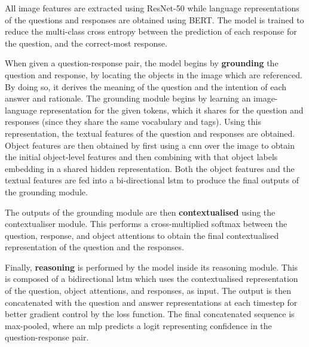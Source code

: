 All image features are extracted using ResNet-50\cite{he_deep_2015} while language representations of the questions and responses are obtained using BERT\cite{devlin_bert_2019}.
The model is trained to reduce the multi-class cross entropy between the prediction of each response for the question, and the correct-most response.

When given a question-response pair, the model begins by \textbf{grounding} the question and response, by locating the objects in the image which are referenced.
By doing so, it derives the meaning of the question and the intention of each answer and rationale.
The grounding module begins by learning an image-language representation for the given tokens, which it shares for the question and responses (since they share the same vocabulary and tags).
Using this representation, the textual features of the question and responses are obtained.
Object features are then obtained by first using a \gls{cnn} over the image to obtain the initial object-level features and then combining with that object labels embedding in a shared hidden representation.
Both the object features and the textual features are fed into a bi-directional \gls{lstm} to produce the final outputs of the grounding module.

The outputs of the grounding module are then \textbf{contextualised} using the contextualiser module.
This performs a cross-multiplied softmax between the question, response, and object attentions to obtain the final contextualised representation of the question and the responses.

Finally, \textbf{reasoning} is performed by the model inside its reasoning module.
This is composed of a bidirectional \gls{lstm} which uses the contextualised representation of the question, object attentions, and responses, as input.
The output is then concatenated with the question and answer representations at each timestep for better gradient control by the loss function.
The final concatenated sequence is max-pooled, where an \gls{mlp} predicts a \gls{logit} representing confidence in the question-response pair.
